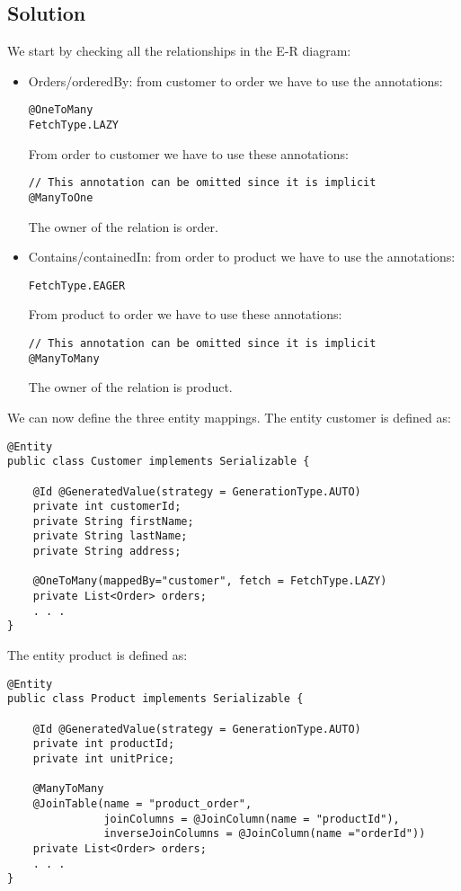 \subsection*{Solution}
We start by checking all the relationships in the E-R diagram: 
\begin{itemize}
    \item Orders/orderedBy: from customer to order we have to use the annotations: 
        \begin{lstlisting}[style=Java]
@OneToMany
FetchType.LAZY
        \end{lstlisting}
        From order to customer we have to use these annotations: 
        \begin{lstlisting}[style=Java]
// This annotation can be omitted since it is implicit
@ManyToOne
        \end{lstlisting}
        The owner of the relation is order. 
    \item Contains/containedIn: from order to product we have to use the annotations: 
        \begin{lstlisting}[style=Java]
FetchType.EAGER
        \end{lstlisting}
        From product to order we have to use these annotations: 
        \begin{lstlisting}[style=Java]
// This annotation can be omitted since it is implicit
@ManyToMany
        \end{lstlisting}
        The owner of the relation is product. 
\end{itemize}
We can now define the three entity mappings. 
The entity customer is defined as:  
\begin{lstlisting}[style=Java]
@Entity
public class Customer implements Serializable {

    @Id @GeneratedValue(strategy = GenerationType.AUTO)
    private int customerId;
    private String firstName;
    private String lastName;
    private String address;

    @OneToMany(mappedBy="customer", fetch = FetchType.LAZY)
    private List<Order> orders;
    . . .
}
\end{lstlisting}
The entity product is defined as:  
\begin{lstlisting}[style=Java]
@Entity
public class Product implements Serializable {

    @Id @GeneratedValue(strategy = GenerationType.AUTO)
    private int productId;
    private int unitPrice;

    @ManyToMany
    @JoinTable(name = "product_order",
               joinColumns = @JoinColumn(name = "productId"),
               inverseJoinColumns = @JoinColumn(name ="orderId"))
    private List<Order> orders; 
    . . .
}
\end{lstlisting}
